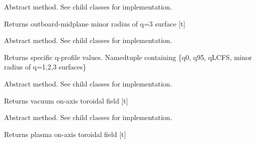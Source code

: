 \documentclass[letterpaper,10pt,english]{sphinxmanual}
\begin{document}
\begin{fulllineitems}
\begin{fulllineitems}
\end{fulllineitems}


\begin{fulllineitems}
\label{\detokenize{eqtools:eqtools.core.Equilibrium.getQ3Surf}}
Abstract method.  See child classes for implementation.

Returns outboard-midplane minor radius of q=3 surface {[}t{]}

\end{fulllineitems}


\begin{fulllineitems}
\label{\detokenize{eqtools:eqtools.core.Equilibrium.getQs}}
Abstract method.  See child classes for implementation.

Returns specific q-profile values.
Namedtuple containing \{q0, q95, qLCFS, minor radius of q=1,2,3 surfaces\}

\end{fulllineitems}


\begin{fulllineitems}
\label{\detokenize{eqtools:eqtools.core.Equilibrium.getBtVac}}
Abstract method.  See child classes for implementation.

Returns vacuum on-axis toroidal field {[}t{]}

\end{fulllineitems}


\begin{fulllineitems}
\label{\detokenize{eqtools:eqtools.core.Equilibrium.getBtPla}}
Abstract method.  See child classes for implementation.

Returns plasma on-axis toroidal field {[}t{]}


\end{fulllineitems}
\end{fulllineitems}
\end{document}
